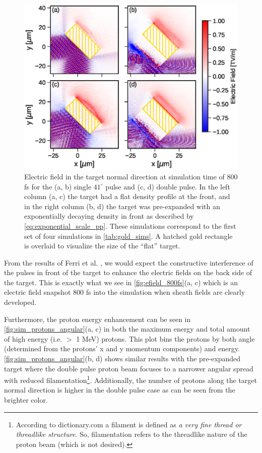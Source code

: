\begin{figure}
	\centering
	\includegraphics[width=0.9\linewidth]{planning/images/titan/efield_800fs.eps}
	\caption{Electric field in the target normal direction at simulation time of 800 fs for the (a, b) single $41^\circ$ pulse and (c, d) double pulse. In the left column (a, c) the target had a flat density profile at the front, and in the right column (b, d) the target was pre-expanded with an exponentially decaying density in front as described by \autoref{eq:exponential_scale_pp}. These simulations correspond to the first set of four simulations in \autoref{tab:gold_sims}. A hatched gold rectangle is overlaid to visualize the size of the ``flat'' target.}
	\label{fig:efield_800fs}
\end{figure}
From the results of Ferri et al. \cite{Ferri_2019_Nat_Comm}, we would expect the constructive interference of the pulses in front of the target to enhance the electric fields on the back side of the target. This is exactly what we see in \autoref{fig:efield_800fs}(a, c) which is an electric field snapshot 800 fs into the simulation when sheath fields are clearly developed. 

Furthermore, the proton energy enhancement can be seen in \autoref{fig:sim_protons_angular}(a, c) in both the maximum energy and total amount of high energy (i.e. $>$ 1 MeV) protons. This plot bins the protons by both angle (determined from the protons' x and y momentum components) and energy. \autoref{fig:sim_protons_angular}(b, d) shows similar results with the pre-expanded target where the double pulse proton beam focuses to a narrower angular spread with reduced filamentation\footnote{According to dictionary.com a filament is defined as \emph{a very fine thread or threadlike structure}. So, filamentation refers to the threadlike nature of the proton beam (which is not desired).}. Additionally, the number of protons along the target normal direction is higher in the double pulse case as can be seen from the brighter color. 

